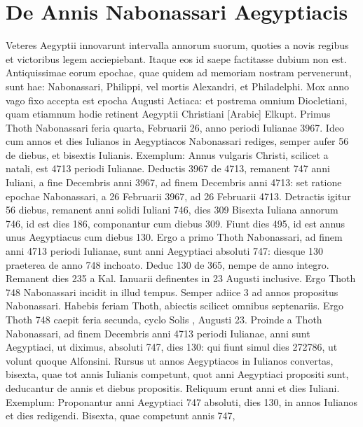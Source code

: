 \section{De Annis Nabonassari Aegyptiacis}
%
Veteres Aegyptii innovarunt intervalla annorum suorum,
quoties a novis regibus et victoribus legem acciepiebant.
Itaque
eos id saepe factitasse dubium non est.
Antiquissimae eorum
epochae, quae quidem ad memoriam nostram pervenerunt,
sunt hae: Nabonassari, Philippi, vel mortis Alexandri, et Philadelphi.
Mox anno vago fixo accepta est epocha Augusti Actiaca: et
postrema omnium Diocletiani, quam etiamnum hodie retinent
Aegyptii Christiani \textarabic{}[Arabic] Elkupt.
Primus Thoth Nabonassari feria
quarta, Februarii 26, anno periodi Iulianae 3967.
Ideo cum
annos et dies Iulianos in Aegyptiacos Nabonassari rediges, semper
aufer 56 de diebus, et bisextis Iulianis.
Exemplum: Annus vulgaris
Christi, scilicet a natali, est 4713 periodi Iulianae.
Deductis
3967 de 4713, remanent 747 anni Iuliani, a fine Decembris anni
3967, ad finem Decembris anni 4713: set ratione epochae Nabonassari,
a 26 Februarii 3967, ad 26 Februarii 4713.
Detractis
igitur 56 diebus, remanent anni solidi Iuliani 746, dies 309
Bisexta Iuliana annorum 746, id est dies 186, componantur cum
diebus 309.
Fiunt dies 495, id est annus unus Aegyptiacus cum diebus
130.
%
Ergo a primo Thoth Nabonassari, ad finem anni 4713 periodi
Iulianae, sunt anni Aegyptiaci absoluti 747: diesque 130 praeterea
de anno 748 inchoato.
Deduc 130 de 365, nempe de anno
integro.
Remanent dies 235 a Kal. Ianuarii definentes in 23 Augusti
inclusive.
Ergo Thoth 748 Nabonassari incidit in illud tempus.
Semper adiice 3 ad annos propositus Nabonassari.
Habebis feriam
Thoth, abiectis scilicet omnibus septenariis.
Ergo Thoth 748
caepit feria secunda, cyclo Solis , Augusti 23.
Proinde a Thoth
Nabonassari, ad finem Decembris anni 4713 periodi Iulianae, anni
sunt Aegyptiaci, ut diximus, absoluti 747, dies 130: qui fiunt
simul dies 272786, ut volunt quoque Alfonsini.
Rursus ut annos
Aegyptiacos in Iulianos convertas, bisexta, quae tot annis Iulianis
competunt, quot anni Aegyptiaci propositi sunt, deducantur de annis
et diebus propositis.
Reliquum erunt anni et dies Iuliani.
Exemplum:
Proponantur anni Aegyptiaci 747 absoluti, dies 130, in annos
Iulianos et dies redigendi.
Bisexta, quae competunt annis 747,
